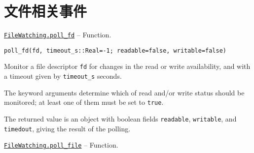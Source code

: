 \chapter{文件相关事件}


\hypertarget{4018465060202185434}{} 
\hyperlink{4018465060202185434}{\texttt{FileWatching.poll\_fd}}  -- {Function.}

\begin{adjustwidth}{2em}{0pt}


\begin{verbatim}
poll_fd(fd, timeout_s::Real=-1; readable=false, writable=false)
\end{verbatim}

Monitor a file descriptor \texttt{fd} for changes in the read or write availability, and with a timeout given by \texttt{timeout\_s} seconds.

The keyword arguments determine which of read and/or write status should be monitored; at least one of them must be set to \texttt{true}.

The returned value is an object with boolean fields \texttt{readable}, \texttt{writable}, and \texttt{timedout}, giving the result of the polling.



\end{adjustwidth}
\hypertarget{16623395181067730756}{} 
\hyperlink{16623395181067730756}{\texttt{FileWatching.poll\_file}}  -- {Function.}

